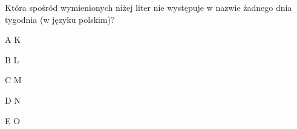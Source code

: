 \begin{tresc}
Która spośród wymienionych niżej liter nie występuje w nazwie żadnego dnia tygodnia (w języku polskim)?
\end{tresc}
\begin{wariant}{A} K \end{wariant}
\begin{wariant}{B} L \end{wariant}
\begin{wariant}{C} M \end{wariant}
\begin{wariant}{D} N \end{wariant}
\begin{wariant}{E} O \end{wariant}
